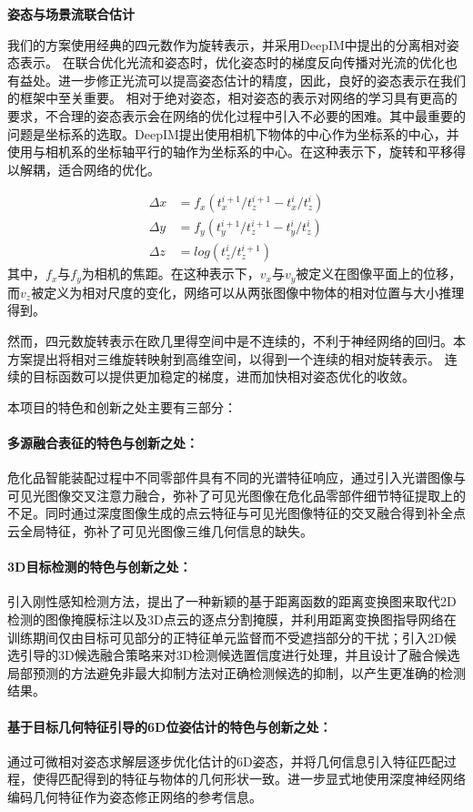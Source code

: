 \documentclass[12pt]{article}
\newcommand{\myPara}[1]{\paragraph{#1：}}
\begin{document}
\textbf{姿态与场景流联合估计}

我们的方案使用经典的四元数作为旋转表示，并采用DeepIM中提出的分离相对姿态表示。
在联合优化光流和姿态时，优化姿态时的梯度反向传播对光流的优化也有益处。进一步修正光流可以提高姿态估计的精度，因此，良好的姿态表示在我们的框架中至关重要。
相对于绝对姿态，相对姿态的表示对网络的学习具有更高的要求，不合理的姿态表示会在网络的优化过程中引入不必要的困难。其中最重要的问题是坐标系的选取。DeepIM提出使用相机下物体的中心作为坐标系的中心，并使用与相机系的坐标轴平行的轴作为坐标系的中心。在这种表示下，旋转和平移得以解耦，适合网络的优化。

\begin{equation}
    \begin{aligned}
    \Delta x & = f_x(t_x^{i+1}/t_z^{i+1} - t_x^i/t_z^i)\\
    \Delta y & = f_y(t_y^{i+1}/t_z^{i+1} - t_y^i/t_z^i) \\
    \Delta z & = log(t_z^i/t_z^{i+1})
\end{aligned}
\end{equation}
其中，$f_x$与$f_y$为相机的焦距。在这种表示下，$v_x$与$v_y$被定义在图像平面上的位移，而$v_z$被定义为相对尺度的变化，网络可以从两张图像中物体的相对位置与大小推理得到。

然而，四元数旋转表示在欧几里得空间中是不连续的，不利于神经网络的回归。本方案提出将相对三维旋转映射到高维空间，以得到一个连续的相对旋转表示。
连续的目标函数可以提供更加稳定的梯度，进而加快相对姿态优化的收敛。
    





本项目的特色和创新之处主要有三部分：
\myPara{多源融合表征的特色与创新之处}
危化品智能装配过程中不同零部件具有不同的光谱特征响应，通过引入光谱图像与可见光图像交叉注意力融合，弥补了可见光图像在危化品零部件细节特征提取上的不足。同时通过深度图像生成的点云特征与可见光图像特征的交叉融合得到补全点云全局特征，弥补了可见光图像三维几何信息的缺失。

\myPara{3D目标检测的特色与创新之处}
引入刚性感知检测方法，提出了一种新颖的基于距离函数的距离变换图来取代2D检测的图像掩膜标注以及3D点云的逐点分割掩膜，并利用距离变换图指导网络在训练期间仅由目标可见部分的正特征单元监督而不受遮挡部分的干扰；引入2D候选引导的3D候选融合策略来对3D检测候选置信度进行处理，并且设计了融合候选局部预测的方法避免非最大抑制方法对正确检测候选的抑制，以产生更准确的检测结果。
\myPara{基于目标几何特征引导的6D位姿估计的特色与创新之处}
通过可微相对姿态求解层逐步优化估计的6D姿态，并将几何信息引入特征匹配过程，使得匹配得到的特征与物体的几何形状一致。进一步显式地使用深度神经网络编码几何特征作为姿态修正网络的参考信息。
\end{document}

